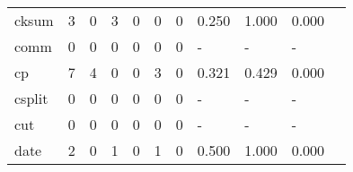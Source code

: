 \begin{longtable}{lp{1.2cm}p{1.2cm}p{1.2cm}p{1.2cm}p{1.2cm}p{1.2cm}p{1.2cm}p{1.2cm}p{1.2cm}p{1.2cm}}
cksum     &                                     3 &                                                  0 &                                                3 &                                               0 &                                                0 &                                              0 &                                         0.250 &                                              1.000 &                                              0.000 \\
comm      &                                     0 &                                                  0 &                                                0 &                                               0 &                                                0 &                                              0 &                                             - &                                                  - &                                                  - \\
cp        &                                     7 &                                                  4 &                                                0 &                                               0 &                                                3 &                                              0 &                                         0.321 &                                              0.429 &                                              0.000 \\
csplit    &                                     0 &                                                  0 &                                                0 &                                               0 &                                                0 &                                              0 &                                             - &                                                  - &                                                  - \\
cut       &                                     0 &                                                  0 &                                                0 &                                               0 &                                                0 &                                              0 &                                             - &                                                  - &                                                  - \\
date      &                                     2 &                                                  0 &                                                1 &                                               0 &                                                1 &                                              0 &                                         0.500 &                                              1.000 &                                              0.000 \\

\end{longtable}
